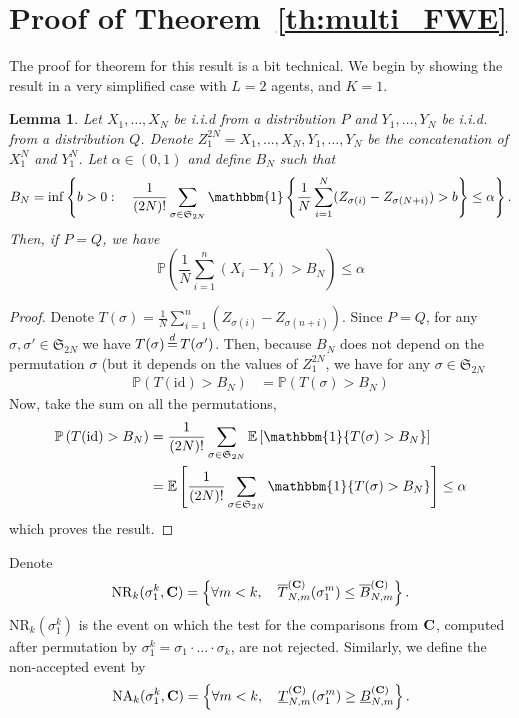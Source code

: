 \documentclass{article}
\theoremstyle{plain}
\newtheorem{Lemma}{Lemma}
\theoremstyle{remark}
\renewcommand{\P}{\mathbb{P}}
\newcommand{\E}{\mathbb{E}}
\renewcommand{\S}{\mathfrak{S}}
\newcommand{\1}{\mathbbm{1}}
\newcommand{\id}{\mathrm{id}}
\newcommand{\dec}{\,{\buildrel d \over =}\,}
\numberwithin{equation}{section}
\begin{document}
\appendix
\section{Proof of Theorem~\ref{th:multi_FWE}}
The proof for theorem for this result is a bit technical. We begin by showing the result in a very simplified case with $L=2$ agents, and $K=1$.
\begin{Lemma}\label{lem:quantile_permu_2}
  Let $X_1,\dots,X_N$ be i.i.d from a distribution $P$ and $Y_1,\dots,Y_N$ be i.i.d. from a distribution $Q$. Denote $Z_1^{2N}=X_1,\dots,X_N,Y_1,\dots,Y_N$ be the concatenation of $X_1^N$ and $Y_1^N$. Let $\alpha \in (0,1)$ and define $B_N$ such that 
  $$ B_N = \inf \left\{b>0:\quad \frac{1}{(2N)!}\sum_{\sigma\in \S_{2N}} \1\left\{ \frac{1}{N}\sum_{i=1}^N (Z_{\sigma(i)}-Z_{\sigma(N+i)}) > b\right\}\le \alpha\right\}.$$
  Then, if $P=Q$, we have 
  $$\P\left(\frac{1}{N}\sum_{i=1}^n (X_i-Y_i) > B_N \right)\le \alpha $$ 
\end{Lemma}
\begin{proof}
  Denote $T(\sigma)= \frac{1}{N}\sum_{i=1}^n (Z_{\sigma(i)}-Z_{\sigma(n+i)})$. Since $P=Q$, for any $\sigma,\sigma' \in \S_{2N}$ we have $T(\sigma)\dec T(\sigma')$. Then, because $B_N$ does not depend on the permutation $\sigma$ (but it depends on the values of $Z_1^{2N}$, we have for any $\sigma \in \S_{2N}$
  \begin{align*}
    \P\left(T(\id)> B_N\right)&=\P\left(T(\sigma)> B_N\right)
  \end{align*} 
  Now, take the sum on all the permutations, 
  \begin{align*}
    \P\left(T(\id)> B_N\right)&=\frac{1}{(2N)!}\sum_{\sigma\in \S_{2N}} \E\left[\1\{T(\sigma)> B_N\}\right]\\
                                      &=  \E\left[\frac{1}{(2N)!}\sum_{\sigma\in \S_{2N}}\1\{T(\sigma)> B_N\}\right]\le \alpha
  \end{align*}
  which proves the result.
\end{proof}

Denote 
$$\mathrm{NR}_k(\sigma_1^k, {\bf C}) = \left\{\forall m < k,\quad  \overline{T}_{N,m}^{({\bf C})}(\sigma_1^m) \le   \overline{B}_{N,m}^{({\bf C})}\right\}.$$
$\mathrm{NR}_k(\sigma_1^k)$ is the event on which the test for the comparisons from ${\bf C}$, computed after permutation by $\sigma_1^k=\sigma_1\cdot \ldots \cdot \sigma_k$, are not rejected. Similarly, we define the non-accepted event by
$$\mathrm{NA}_k(\sigma_1^k, {\bf C}) = \left\{\forall m < k,\quad  \underline{T}_{N,m}^{({\bf C})}(\sigma_1^m) \ge   \underline{B}_{N,m}^{({\bf C})}\right\}.$$
\end{document}
